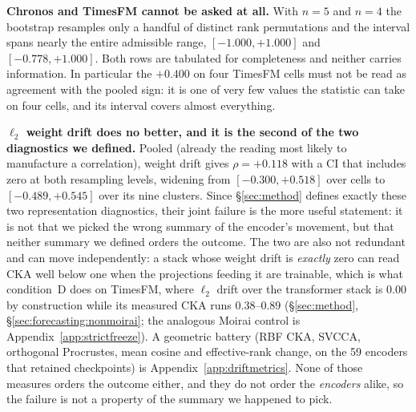 \begin{table}[ht]
\centering\footnotesize
\caption{\textbf{The within-backbone dissociation, one capacity, eight cells.}
Every Moirai-Base cell, ordered by CKA (most drifted first). ``Full FT'' and
``Frozen'' are percent change in held-out MSE against zero-shot, so negative is
better and positive is task-level forgetting; $\denc$ is the manipulated contrast
between them. Gate values marked~\textsuperscript{f} fail the $0.20$ screen.
Reading down the CKA column, the outcome reverses sign: the two least drifted
cells are the only two that degrade. Emitted by
\texttt{scripts/emit\_dissociation.py}, which asserts both of those claims
against the run records and exits non-zero if they stop holding; these four CKA
values and four percentages were previously quoted in body prose alone.}
\label{tab:dissociation}

\end{table}

\textbf{Chronos and TimesFM cannot be asked at all.} With $n{=}5$ and $n{=}4$
the bootstrap resamples only a handful of distinct rank permutations and the
interval spans nearly the entire admissible range, $[-1.000, +1.000]$ and
$[-0.778, +1.000]$. Both rows are tabulated for completeness and neither
carries information. In particular the $+0.400$ on four TimesFM cells must not
be read as agreement with the pooled sign: it is one of very few values the
statistic can take on four cells, and its interval covers almost everything.

\textbf{$\ell_2$ weight drift does no better, and it is the second of the two
diagnostics we defined.} Pooled (already the reading most likely to manufacture
a correlation), weight drift gives $\rho{=}{+}0.118$ with a CI that includes
zero at both resampling levels, widening from $[-0.300, +0.518]$ over cells to
$[-0.489, +0.545]$ over its nine clusters. Since \S\ref{sec:method} defines
exactly these two representation
diagnostics, their joint failure is the more useful statement: it is not that we
picked the wrong summary of the encoder's movement, but that neither summary we
defined orders the outcome. The two are also not redundant and can move
independently: a stack whose weight drift is \emph{exactly} zero can read CKA
well below one when the projections feeding it are trainable, which is what
condition~D does on TimesFM, where $\ell_2$ drift over the transformer stack is
$0.00$ by construction while its measured CKA runs $0.38$--$0.89$
(\S\ref{sec:method}, \S\ref{sec:forecasting:nonmoirai}; the analogous Moirai
control is Appendix~\ref{app:strictfreeze}). A geometric battery (RBF CKA,
SVCCA, orthogonal Procrustes, mean cosine and effective-rank change, on the 59
encoders that retained checkpoints) is Appendix~\ref{app:driftmetrics}. None of
those measures orders the outcome either, and they do not order the
\emph{encoders} alike, so the failure is not a property of the summary we
happened to pick.

